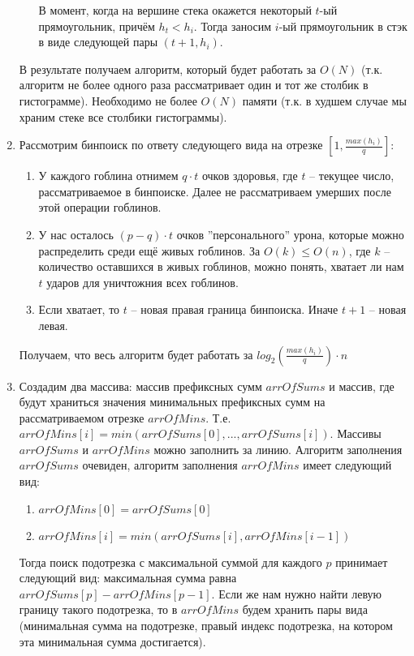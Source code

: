\documentclass{article}
\begin{document}
\begin{enumerate}
\begin{enumerate}
    В момент, когда на вершине стека окажется некоторый $t$-ый прямоугольник, причём $h_t < h_i$. Тогда заносим $i$-ый прямоугольник в стэк в виде следующей пары $(t+1, h_i)$.
\end{enumerate}

В результате получаем алгоритм, который будет работать за $O(N)$ (т.к. алгоритм не более одного раза рассматривает один и тот же столбик в гистограмме). Необходимо не более $O(N)$ памяти (т.к. в худшем случае мы храним стеке все столбики гистограммы).

\item Рассмотрим бинпоиск по ответу следующего вида на отрезке $[1, \frac{max (h_i)}{q}]$:

\begin{enumerate}
    \item У каждого гоблина отнимем $q \cdot t$ очков здоровья, где $t$ -- текущее число, рассматриваемое в бинпоиске. Далее не рассматриваем умерших после этой операции гоблинов.
    
    \item У нас осталось $(p - q) \cdot t$ очков ''персонального'' урона, которые можно распределить среди ещё живых гоблинов. За $O(k) \leq O(n)$, где $k$ -- количество оставшихся в живых гоблинов, можно понять, хватает ли нам $t$ ударов для уничтожния всех гоблинов.
    
    \item Если хватает, то $t$ -- новая правая граница бинпоиска. Иначе $t+1$ -- новая левая.
\end{enumerate}

Получаем, что весь алгоритм будет работать за $log_2 (\frac{max (h_i)}{q })\cdot n$

\item Создадим два массива: массив префиксных сумм $arrOfSums$ и массив, где будут храниться значения минимальных префиксных сумм на рассматриваемом отрезке $arrOfMins$. Т.е. $arrOfMins[i] = min(arrOfSums[0], ... , arrOfSums[i])$. Массивы $arrOfSums$ и $arrOfMins$ можно заполнить за линию. Алгоритм заполнения $arrOfSums$ очевиден, алгоритм заполнения $arrOfMins$ имеет следующий вид:
\begin{enumerate}
    \item $arrOfMins[0] = arrOfSums[0]$
    
    \item  $arrOfMins[i] = min (arrOfSums[i], arrOfMins[i-1])$
\end{enumerate}

Тогда поиск подотрезка с максимальной суммой для каждого $p$ принимает следующий вид: максимальная сумма равна $arrOfSums[p] - arrOfMins[p-1]$. Если же нам нужно найти левую границу такого подотрезка, то в $arrOfMins$ будем хранить пары вида (минимальная сумма на подотрезке, правый индекс подотрезка, на котором эта минимальная сумма достигается).


\end{enumerate}
\end{document}
